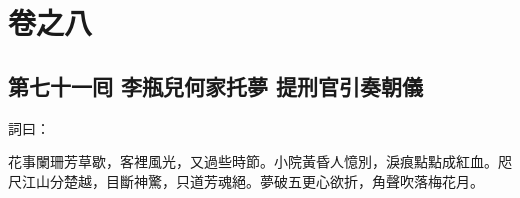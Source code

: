 \part*{{\titlename}卷之八}



\chapter*{第七十一囘 李瓶兒何家托夢 提刑官引奏朝儀}


詞曰：

\begin{myquote}
花事闌珊芳草歇，客裡風光，又過些時節。小院黃昏人憶別，淚痕點點成紅血。咫尺江山分楚越，目斷神驚，只道芳魂絕。夢破五更心欲折，角聲吹落梅花月。

\end{myquote}

